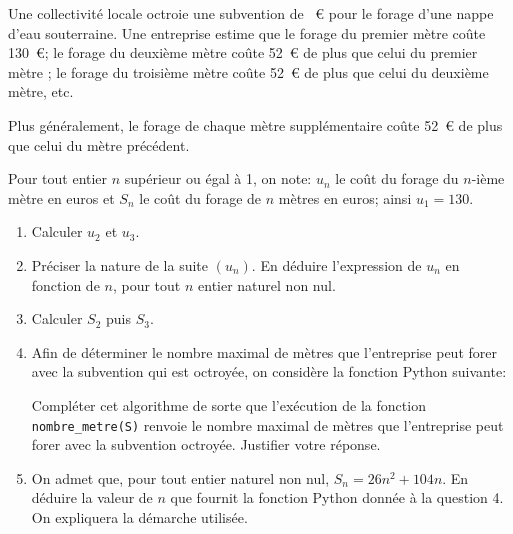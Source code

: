 \bigskip

Une collectivité locale octroie une subvention de ~\euro{} pour le forage d'une nappe d'eau souterraine. Une entreprise estime que le forage du premier mètre coûte 130~\euro; le
forage du deuxième mètre coûte 52~\euro{} de plus que celui du premier mètre ; le forage du
troisième mètre coûte 52~\euro{} de plus que celui du deuxième mètre, etc.

Plus généralement, le forage de chaque mètre supplémentaire coûte 52~\euro{} de plus que celui
du mètre précédent.

Pour tout entier $n$ supérieur ou égal à 1, on note: $u_n$ le coût du forage du $n$-ième mètre en
euros et $S_n$ le coût du forage de $n$ mètres en euros; ainsi $u_1=130$.

\medskip

\begin{enumerate}
\item Calculer $u_2$ et $u_3$.
\item Préciser la nature de la suite $\left(u_n\right)$. En déduire l'expression de $u_n$ en fonction de $n$, pour tout $n$ entier naturel non nul.
\item Calculer $S_2$ puis $S_3$.
\item Afin de déterminer le nombre maximal de mètres que l'entreprise peut forer avec la subvention qui est octroyée, on considère la fonction Python suivante:

\begin{center}
\end{center}
Compléter cet algorithme de sorte que l'exécution de la fonction \verb!nombre_metre(S)! renvoie le nombre maximal de mètres que l'entreprise peut forer avec la subvention octroyée. Justifier votre réponse.

\item On admet que, pour tout entier naturel non nul, $S_n=26n^2 +104n$. En déduire la valeur de
$n$ que fournit la fonction Python donnée à la question 4. On expliquera la démarche utilisée.
\end{enumerate}
